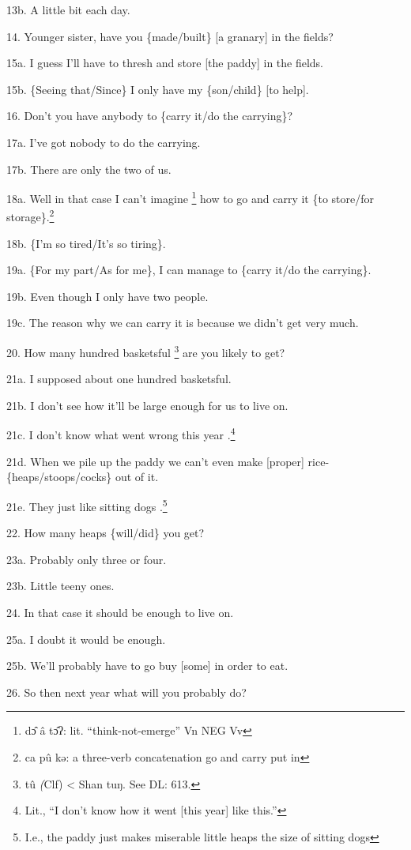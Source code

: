 13b. A little bit each day.

14. Younger sister, have you \{made/built\} [a granary] in the fields?

15a. I guess I'll have to thresh and store [the paddy] in the fields.

15b. \{Seeing that/Since\} I only have my \{son/child\} [to help].

16. Don't you have anybody to \{carry it/do the carrying\}?

17a. I've got nobody to do the carrying.

17b. There are only the two of us.

18a. Well in that case I can't imagine \footnote{dɔ̂ â tɔ̂ʔ: lit. ``think-not-emerge''  Vn NEG Vv} how to go and carry it \{to store/for
storage\}.\footnote{ca  pû  kə: a three-verb concatenation  go and carry put in}

18b. \{I'm so tired/It's so tiring\}.

19a. \{For my part/As for me\}, I can manage to \{carry it/do the carrying\}.

19b. Even though I only have two people.

19c. The reason why we can carry it is because we didn't get very much.

20. How many hundred basketsful \footnote{tû \emph{(}Clf) < Shan tuŋ. See DL: 613.} are you likely to get?

21a. I supposed about one hundred basketsful.

21b. I don't see how it'll be large enough for us to live on.

21c. I don't know what went wrong this year .\footnote{Lit., ``I don't know how it went [this year] like this.''}

21d. When we pile up the paddy we can't even make [proper] rice-\{heaps/stoops/cocks\}
out of it.

21e. They just like sitting dogs .\footnote{I.e., the paddy just makes miserable little heaps the size of sitting dogs}

22. How many heaps \{will/did\} you get?

23a. Probably only three or four.

23b. Little teeny ones.

24. In that case it should be enough to live on.

25a. I doubt it would be enough.

25b. We'll probably have to go buy [some] in order to eat.

26. So then next year what will you probably do?

